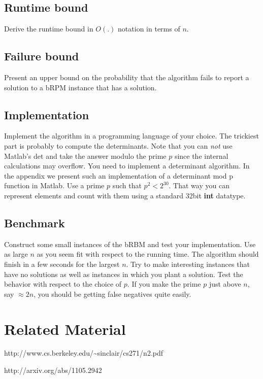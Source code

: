 \documentclass{tufte-handout}
\begin{document}
\subsection*{Runtime bound}
Derive the runtime bound in $O(.)$ notation in terms of $n$.
\subsection*{Failure bound}
Present an upper bound on the probability that the algorithm fails to report a solution to a bRPM instance that has a solution.
\subsection*{Implementation}
Implement the algorithm in a programming language of your choice. The trickiest part is probably to compute the determinants. Note that you can \emph{not} use Matlab's det and take the answer modulo the prime $p$ since the internal calculations may overflow. You need to implement a determinant algorithm.
In the appendix we present such an implementation of a determinant mod p function in Matlab.
Use a prime $p$ such that $p^2<2^{30}$. That way you can represent elements and count with them using a standard 32bit \textbf{int} datatype.

\subsection*{Benchmark}
Construct some small instances of the bRBM and test your implementation. Use as large $n$ as you seem fit with respect to the running time. The algorithm should finish in a few seconds for the largest $n$.  Try to make interesting instances that have no solutions as well as instances in which you plant a solution. Test the behavior with respect to the choice of $p$. If you make the prime $p$ just above $n$, say $\approx 2n$,  you should be getting false negatives quite easily.

\section*{Related Material}
\noindent [S11] http://www.cs.berkeley.edu/\textasciitilde sinclair/cs271/n2.pdf

\noindent [Hu11] http://arxiv.org/abs/1105.2942

\newpage
\end{document}
